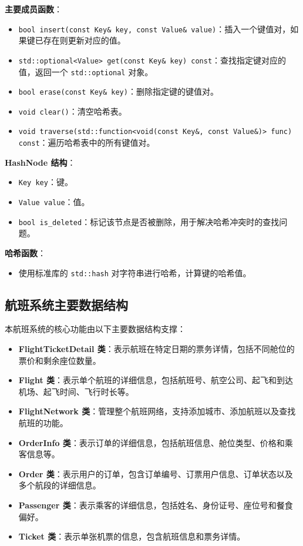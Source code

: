 \documentclass[UTF8, a4paper,12pt]{ctexart}
\begin{document}
\textbf{主要成员函数}：

\begin{itemize}
    \item \texttt{bool insert(const Key\& key, const Value\& value)}：插入一个键值对，如果键已存在则更新对应的值。
    \item \texttt{std::optional<Value> get(const Key\& key) const}：查找指定键对应的值，返回一个 \texttt{std::optional} 对象。
    \item \texttt{bool erase(const Key\& key)}：删除指定键的键值对。
    \item \texttt{void clear()}：清空哈希表。
    \item \texttt{void traverse(std::function<void(const Key\&, const Value\&)> func) const}：遍历哈希表中的所有键值对。
\end{itemize}

\textbf{HashNode 结构}：

\begin{itemize}
    \item \texttt{Key key}：键。
    \item \texttt{Value value}：值。
    \item \texttt{bool is\_deleted}：标记该节点是否被删除，用于解决哈希冲突时的查找问题。
\end{itemize}

\textbf{哈希函数}：

\begin{itemize}
    \item 使用标准库的 \texttt{std::hash} 对字符串进行哈希，计算键的哈希值。
\end{itemize}

\subsection{航班系统主要数据结构}

本航班系统的核心功能由以下主要数据结构支撑：

\begin{itemize}
    \item \textbf{FlightTicketDetail 类}：表示航班在特定日期的票务详情，包括不同舱位的票价和剩余座位数量。
    \item \textbf{Flight 类}：表示单个航班的详细信息，包括航班号、航空公司、起飞和到达机场、起飞时间、飞行时长等。
    \item \textbf{FlightNetwork 类}：管理整个航班网络，支持添加城市、添加航班以及查找航班的功能。
    \item \textbf{OrderInfo 类}：表示订单的详细信息，包括航班信息、舱位类型、价格和乘客信息等。
    \item \textbf{Order 类}：表示用户的订单，包含订单编号、订票用户信息、订单状态以及多个航段的详细信息。
    \item \textbf{Passenger 类}：表示乘客的详细信息，包括姓名、身份证号、座位号和餐食偏好。
    \item \textbf{Ticket 类}：表示单张机票的信息，包含航班信息和票务详情。
\end{itemize}
\end{document}
